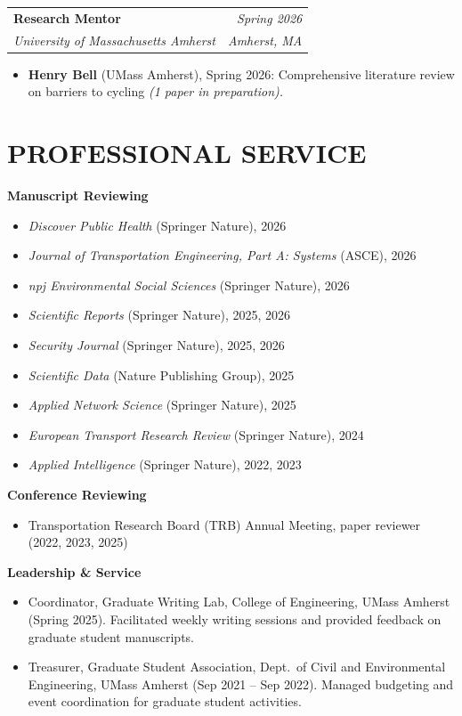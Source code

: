 \documentclass[10pt, a4paper]{article}
\makeatletter
\newcommand{\entry}[4]{%
  \noindent
  \begin{tabularx}{\linewidth}{@{}X@{\hspace{4pt}}r@{}}
    \textbf{#1} & \textit{\small\color{subtle}#2} \\
    \textit{\small\color{subtle}#3} & \textit{\small\color{subtle}#4}
  \end{tabularx}\vspace{2pt}%
}
\makeatother
\begin{document}
\vspace{4pt}
\entry{Research Mentor}{Spring 2026}
      {University of Massachusetts Amherst}{Amherst, MA}
\begin{itemize}
  \item \textbf{Henry Bell} (UMass Amherst), Spring 2026: Comprehensive literature review on barriers to cycling \textit{(1 paper in preparation).}
\end{itemize}


\section{PROFESSIONAL SERVICE}

\textbf{Manuscript Reviewing}
\begin{itemize}
  \item \textit{Discover Public Health} (Springer Nature), 2026
  \item \textit{Journal of Transportation Engineering, Part A: Systems} (ASCE), 2026
  \item \textit{npj Environmental Social Sciences} (Springer Nature), 2026
  \item \textit{Scientific Reports} (Springer Nature), 2025, 2026
  \item \textit{Security Journal} (Springer Nature), 2025, 2026
  \item \textit{Scientific Data} (Nature Publishing Group), 2025
  \item \textit{Applied Network Science} (Springer Nature), 2025
  \item \textit{European Transport Research Review} (Springer Nature), 2024
  \item \textit{Applied Intelligence} (Springer Nature), 2022, 2023
\end{itemize}

\vspace{4pt}
\textbf{Conference Reviewing}
\begin{itemize}
  \item Transportation Research Board (TRB) Annual Meeting, paper reviewer (2022, 2023, 2025)
\end{itemize}

\vspace{4pt}
\textbf{Leadership \& Service}
\begin{itemize}
  \item Coordinator, Graduate Writing Lab, College of Engineering, UMass Amherst (Spring 2025). Facilitated weekly writing sessions and provided feedback on graduate student manuscripts.
  \item Treasurer, Graduate Student Association, Dept.\ of Civil and Environmental Engineering, UMass Amherst (Sep 2021 -- Sep 2022). Managed budgeting and event coordination for graduate student activities.
\end{itemize}
\end{document}
